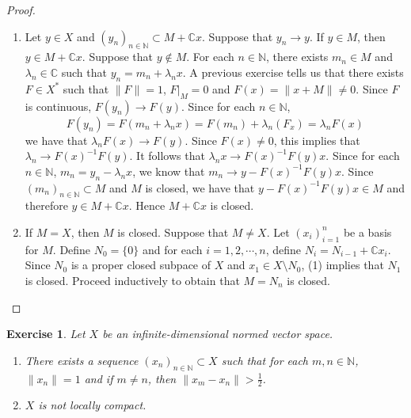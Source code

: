 \documentclass[12pt]{amsart}
\newtheorem{ex}[thm]{Exercise}
\newcommand{\lam}{\lambda}
\newcommand{\C}{\mathbb{C}}
\newcommand{\N}{\mathbb{N}}
\newcommand{\conv}[1]{\xrightarrow{#1}}
\begin{document}
	\begin{proof}
		\begin{enumerate}
			\item Let $y \in X$ and $(y_n)_{n \in \N} \subset M+ \C x$. Suppose that $y_n \conv{} y$. If $y \in M$, then $y \in M+ \C x$. Suppose that $y \not \in M$. For each $n \in \N$, there exists $m_n \in M$ and $\lam_n \in \C$ such that $y_n = m_n + \lam_nx$. A previous exercise tells us that there exists $F \in X^*$ such that $\|F \|= 1$, $F|_M = 0$ and $F(x) = \|x+M \|\neq 0$. Since $F$ is continuous, $F(y_n) \conv{} F(y)$. Since for each $n \in \N$, $$F(y_n) = F(m_n + \lam_n x) = F(m_n)+ \lam_n (F_x) = \lam_n F(x)$$ we have that $\lam_n F(x) \conv{} F(y)$. Since $F(x) \neq 0$, this implies that $\lam_n \conv{} F(x)^{-1} F(y)$. It follows that $\lam_n x \conv{}F(x)^{-1}F(y)x$. Since  for each $n \in \N$, $m_n = y_n - \lam_nx$, we know that $m_n \conv{} y-F(x)^{-1}F(y)x$. Since $(m_n)_{n \in \N} \subset M$ and $M$ is closed, we have that $y-F(x)^{-1}F(y)x \in M$ and therefore $y \in M+\C x$. Hence $M+\C x$ is closed. \vspace{.5cm}\\
			\item If $M = X$, then $M$ is closed. Suppose that $M \neq X$. Let $(x_i)_{i=1}^n$ be a basis for $M$. Define $N_0 = \{0\}$ and for each $i =1,2, \cdots, n$, define $N_i = N_{i-1}+\C x_i$. Since $N_0$ is a proper closed subpace of $X$ and $x_1 \in X \setminus N_0$, (1) implies that $N_1$ is closed. Proceed inductively to obtain that $M = N_n$ is closed.
		\end{enumerate}
	\end{proof}
	
	\begin{ex}
		Let $X$ be an infinite-dimensional normed vector space. 
		\begin{enumerate}
			\item There exists a sequence $(x_n)_{n\in \N} \subset X$ such that for each $m, n \in \N$, $\|x_n \|= 1$ and if $m \neq n$, then $\|x_m - x_n \|> \frac{1}{2}$.
			\item $X$ is not locally compact. 
		\end{enumerate}
	\end{ex}
	
\end{document}

